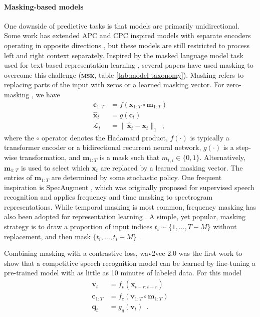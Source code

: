 \paragraph{Masking-based models} One downside of predictive tasks is that models are primarily unidirectional. Some work has extended APC and CPC inspired models with separate encoders operating in opposite directions \cite{ling2020deep, kawakami2020learning, borgholt2021scaling}, but these models are still restricted to process left and right context separately. Inspired by the masked language model task used for text-based representation learning \cite{devlin2019bert}, several papers have used masking to overcome this challenge (\textbf{\textsc{msk}}, table \ref{tab:model-taxonomy}). Masking refers to replacing parts of the input with zeros or a learned masking vector. For zero-masking \cite{jiang2019improving, liu2020mockingjay, wang2020unsupervised, chi2021audio, ling2020decoar}, we have
\begin{align}
    \mathbf{c}_{1:T} &= f(\mathbf{x}_{1:T} \circ \mathbf{m}_{1:T})\\
    \mathbf{\hat{x}}_{t} &= g(\mathbf{c}_{t}) \\
    \mathcal{L}_t &= \lVert \mathbf{\hat{x}}_{t} - \mathbf{x}_{t} \rVert_1\enspace,
\end{align}
where the $\circ$ operator denotes the Hadamard product, $f(\cdot)$ is typically a transformer encoder or a bidirectional recurrent neural network, $g(\cdot)$ is a step-wise transformation, and $\mathbf{m}_{1:T}$ is a mask such that $m_{t,i} \in \{0,1\}$. Alternatively, $\mathbf{m}_{1:T}$ is used to select which $\mathbf{x}_t$ are replaced by a learned masking vector. The entries of $\mathbf{m}_{1:T}$ are determined by some stochastic policy. One frequent inspiration is SpecAugment \cite{park2019specaugment}, which was originally proposed for supervised speech recognition and applies frequency and time masking to spectrogram representations.
While temporal masking is most common, frequency masking has also been adopted for representation learning  \cite{wang2020unsupervised}. A simple, yet popular, masking strategy is to draw a proportion of input indices $t_i\sim\{1,\dots,T-M\}$ without replacement, and then mask $\{t_i, \dots, t_i+M\}$ \cite{baevski2020wav2vec, hsu2021hubert, ling2020decoar}.

Combining masking with a contrastive loss, wav2vec 2.0 was the first work to show that a competitive speech recognition model can be learned by fine-tuning a pre-trained model with as little as 10 minutes of labeled data. For this model
%
\begin{align}
    \mathbf{v}_{t} &= f_v(\mathbf{x}_{t-r:t+r}) \\
    \mathbf{c}_{1:T} &= f_c(\mathbf{v}_{1:T} \circ \mathbf{m}_{1:T}) \\
    \mathbf{q}_t &= g_q(\mathbf{v}_t) \enspace . \label{w2v2 qtz}
\end{align}

